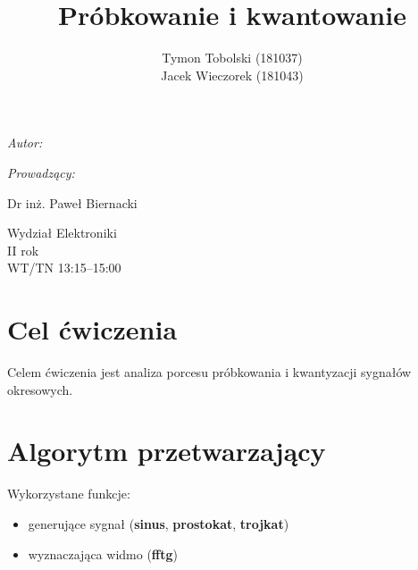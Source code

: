 \documentclass[wide,a4paper,titlepage,12pt]{mwart}
\title{Próbkowanie i kwantowanie}
\author{Tymon Tobolski (181037)\\ Jacek Wieczorek (181043)}
\makeatletter
\renewcommand{\maketitle}{
\begin{titlepage}
  \begin{center}
    \vspace*{3cm}
    \LARGE \@title \par
    \vspace{2cm}
    \textit{\small Autor:}\par
    \normalsize \@author\par \normalsize
    \vspace{3cm}
    \textit{\small Prowadzący:}\par
    Dr inż. Paweł Biernacki \par
    \vspace{2cm}
    Wydział Elektroniki\\ II rok\\ WT/TN 13:15--15:00 \par
    \vspace{5cm}
    \small \@date
  \end{center}
\end{titlepage}
}
\makeatother
\begin{document}
  \maketitle
  \section{Cel ćwiczenia} %
  \label{sec:Cel}
    Celem ćwiczenia jest analiza porcesu próbkowania i kwantyzacji sygnałów okresowych.
    
  \section{Algorytm przetwarzający}
    Wykorzystane funkcje:
    \newline
    \begin{itemize}
      \item generujące sygnał (\textbf{sinus}, \textbf{prostokat}, \textbf{trojkat})
			\item wyznaczająca widmo (\textbf{fftg})
    \end{itemize}
  
  \lstset{ %
    language=Octave,                %
    basicstyle=\scriptsize,       %
    numbers=left,                   %
    numberstyle=\scriptsize,      %
    stepnumber=10,                   %
    numbersep=9pt,                  %
    showspaces=false,               %
    showstringspaces=false,         %
    showtabs=false,                 %
    breaklines=true,                %
    }
    
    
\end{document}
